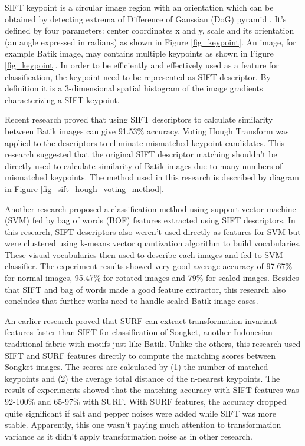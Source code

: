 \documentclass[conference]{IEEEtran}
\begin{document}
SIFT keypoint is a circular image region with an orientation which can be obtained by detecting extrema of Difference of Gaussian (DoG) pyramid \cite{lowe2004distinctive}. It's defined by four parameters: center coordinates x and y, scale and its orientation (an angle expressed in radians) as shown in Figure \ref{fig_keypoint}. An image, for example Batik image, may contains multiple keypoints as shown in Figure \ref{fig_keypoint}. In order to be efficiently and effectively used as a feature for classification, the keypoint need to be represented as SIFT descriptor. By definition it is a 3-dimensional spatial histogram of the image gradients characterizing a SIFT keypoint.

Recent research \cite{nurhaida2015automatic} proved that using SIFT descriptors to calculate similarity between Batik images can give 91.53\% accuracy. Voting Hough Transform was applied to the descriptors to eliminate mismatched keypoint candidates. This research suggested that the original SIFT descriptor matching shouldn't be directly used to calculate similarity of Batik images due to many numbers of mismatched keypoints. The method used in this research is described by diagram in Figure \ref{fig_sift_hough_voting_method}.

Another research \cite{azhar2015batik} proposed a classification method using support vector machine (SVM) fed by bag of words (BOF) features extracted using SIFT descriptors. In this research, SIFT descriptors also weren't used directly as features for SVM but were clustered using k-means vector quantization algorithm to build vocabularies. These visual vocabularies then used to describe each images and fed to SVM classifier. The experiment results showed very good average accuracy of 97.67\% for normal images, 95.47\% for rotated images and 79\% for scaled images. Besides that SIFT and bag of words made a good feature extractor, this research also concludes that further works need to handle scaled Batik image cases.

An earlier research \cite{willy2013evaluation} proved that SURF can extract transformation invariant features faster than SIFT for classification of Songket, another Indonesian traditional fabric with motifs just like Batik. Unlike the others, this research used SIFT and SURF features directly to compute the matching scores between Songket images. The scores are calculated by (1) the number of matched keypoints and (2) the average total distance of the n-nearest keypoints. The result of experiments showed that the matching accuracy with SIFT features was 92-100\% and 65-97\% with SURF. With SURF features, the accuracy dropped quite significant if salt and pepper noises were added while SIFT was more stable. Apparently, this one wasn't paying much attention to transformation variance as it didn't apply transformation noise as in other research\cite{azhar2015batik}.
\end{document}
